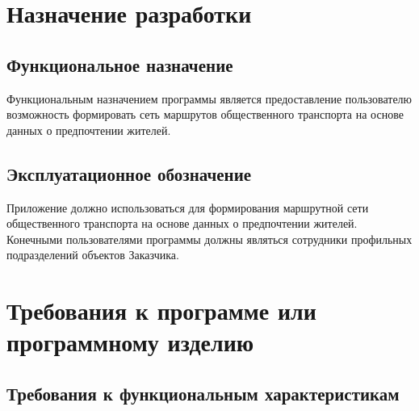 \chapter{Назначение разработки}
\section{Функциональное назначение}
Функциональным назначением программы является предоставление пользователю возможность формировать сеть 
маршрутов общественного транспорта на основе данных о предпочтении жителей.

\section{Эксплуатационное обозначение}
Приложение должно использоваться для формирования маршрутной сети общественного транспорта на основе данных 
о предпочтении жителей. Конечными пользователями программы должны являться сотрудники профильных подразделений 
объектов Заказчика.

\chapter{Требования к программе или программному изделию}
\section{Требования к функциональным характеристикам}
